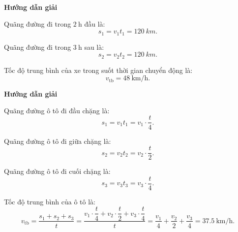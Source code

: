 \setcounter{section}{0}
\setcounter{viduii}{0}
{	\begin{center}
		\textbf{Hướng dẫn giải}
	\end{center}
	
	Quãng đường đi trong $\SI{2}{\hour}$ đầu là:
	\begin{equation*}
		s_1 = v_1t_1  = \SI{120}{km}.
	\end{equation*}
	
	Quãng đường đi trong $\SI{3}{\hour}$ sau là:
	\begin{equation*}
		s_2 = v_2t_2 = \SI{120}{km}.
	\end{equation*}
	
	Tốc độ trung bình của xe trong suốt thời gian chuyển động là:
	\begin{equation*}
		v_{\text{tb}}=\SI{48}{\km/\hour}.
	\end{equation*}
	
}
{	\begin{center}
		\textbf{Hướng dẫn giải}
	\end{center}
	
	Quãng đường ô tô đi đầu chặng là:
	\begin{equation*}
		s_1=v_1t_1=v_1\cdot\dfrac{t}{4}.
	\end{equation*}
	
	Quãng đường ô tô đi giữa chặng là:
	\begin{equation*}
		s_2=v_2t_2=v_2\cdot\dfrac{t}{2}.
	\end{equation*}
	
	Quãng đường ô tô đi cuối chặng là:
	\begin{equation*}
		s_3=v_3t_3=v_3\cdot\dfrac{t}{4}.
	\end{equation*}
	
	Tốc độ trung bình của ô tô là:
	\begin{equation*}
		v_{\text{tb}}=\dfrac{s_1+s_2+s_3}{t}=\dfrac{v_1\cdot\dfrac{t}{4}+v_2\cdot\dfrac{t}{2}+v_3\cdot\dfrac{t}{4}}{t}=\dfrac{v_1}{4}+\dfrac{v_2}{2}+\dfrac{v_3}{4}=\SI{37,5}{\km/\hour}.
	\end{equation*}
}


